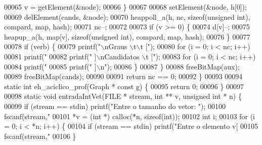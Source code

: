 \begin{DoxyCode}
{{00065                         v = getElement(&node);
00066                 \}
00067 
00068                 setElement(&node, h[0]);
00069                 delElement(cands, &node);
00070                 heappoll_a(h, nc, \textcolor{keyword}{sizeof}(\textcolor{keywordtype}{unsigned} \textcolor{keywordtype}{int}), compard, map, hash);
00071                 nc--;
00072 
00073                 \textcolor{keywordflow}{if} (v >= 0) \{
00074                         d[v]--;
00075                         heapup_a(h, map[v], \textcolor{keyword}{sizeof}(\textcolor{keywordtype}{unsigned} \textcolor{keywordtype}{int}), compard, map, hash);
00076                 \}
00077 
00078                 \textcolor{keywordflow}{if} (verb) \{
00079                         printf(\textcolor{stringliteral}{"\(\backslash\)nGraus \(\backslash\)t\(\backslash\)t ["});
00080                         \textcolor{keywordflow}{for} (i = 0; i < nc; i++)
00081                                 printf(\textcolor{stringliteral}{" %
00082                         printf(\textcolor{stringliteral}{" ]\(\backslash\)nCandidatos \(\backslash\)t ["});
00083                         \textcolor{keywordflow}{for} (i = 0; i < nc; i++)
00084                                 printf(\textcolor{stringliteral}{" %
00085                         printf(\textcolor{stringliteral}{" ]\(\backslash\)n"});
00086                 \}
00087         \}
00088         freeBitMap(aux);
00089         freeBitMap(cands);
00090 
00091         \textcolor{keywordflow}{return} nc == 0;
00092 \}
00093 
00094 \textcolor{keyword}{static} \textcolor{keywordtype}{int} eh\_aciclico\_prof(Graph * \textcolor{keyword}{const} g) \{
00095         \textcolor{keywordflow}{return} 0;
00096 \}
00097 
00098 \textcolor{keyword}{static} \textcolor{keywordtype}{void} entradaIntVet(FILE * stream, \textcolor{keywordtype}{int} ** v, \textcolor{keywordtype}{unsigned} \textcolor{keywordtype}{int} * n) \{
00099         \textcolor{keywordflow}{if} (stream == stdin) printf(\textcolor{stringliteral}{"Entre o tamanho do vetor: "});
00100         fscanf(stream,\textcolor{stringliteral}{"%
00101         *v = (\textcolor{keywordtype}{int} *) calloc(*n, \textcolor{keyword}{sizeof}(\textcolor{keywordtype}{int}));
00102         \textcolor{keywordtype}{int} i;
00103         \textcolor{keywordflow}{for} (i = 0; i < *n; i++) \{
00104                 \textcolor{keywordflow}{if} (stream == stdin) printf(\textcolor{stringliteral}{"Entre o elemento v[%
00105                 fscanf(stream,\textcolor{stringliteral}{"%
00106         \}
}}}}}}}
\end{DoxyCode}
